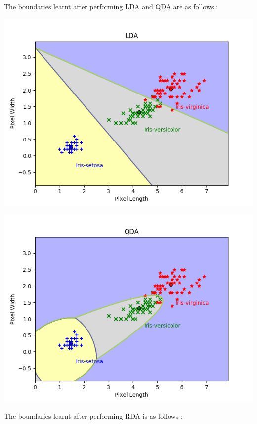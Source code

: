 \documentclass[paper=a4, fontsize=11pt]{scrartcl}
\numberwithin{equation}{section}		%
\numberwithin{figure}{section}			%
\numberwithin{table}{section}				%
\begin{document}
The boundaries learnt after performing LDA and QDA are as follows :\\

\graphicspath{ {../EE15B025_PA2/Code/q3/} }
\begin{center}
\includegraphics[scale=0.6]{LDA}
\end{center}

\begin{center}
\includegraphics[scale=0.6]{QDA}
\end{center}
The boundaries learnt after performing RDA is as follows :\\
\end{document}
